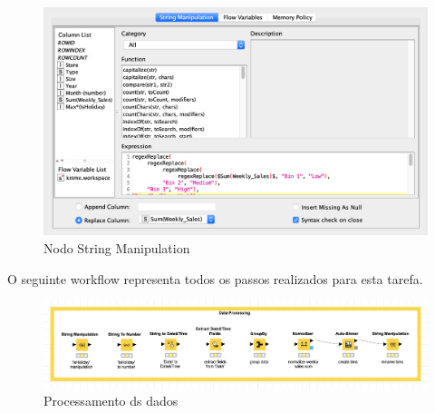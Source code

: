 \begin{figure}[H]
    \centering
    \includegraphics[scale=0.3]{Images/T2_f.png}
    \caption{Nodo String Manipulation}
\end{figure}

O seguinte workflow representa todos os passos realizados para esta tarefa.

\begin{figure}[H]
    \centering
    \includegraphics[scale=0.3]{Images/T2.png}
    \caption{Processamento ds dados}
\end{figure}